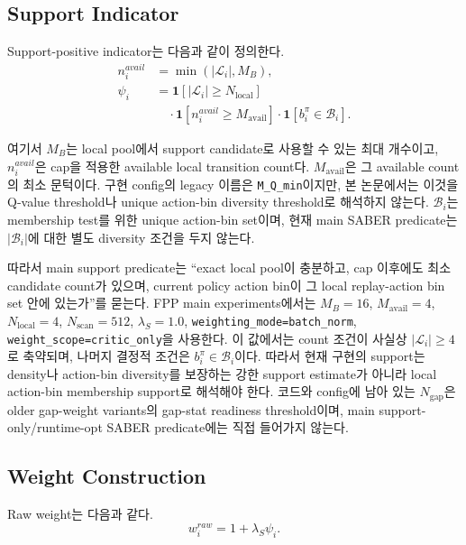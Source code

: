 \documentclass[letterpaper]{article}
\begin{document}
\subsection{Support Indicator}

Support-positive indicator는 다음과 같이 정의한다.
\begin{equation}
\begin{aligned}
n_i^{avail} &= \min(|\mathcal L_i|, M_B),\\
\psi_i &= \mathbf 1[|\mathcal L_i|\ge N_{\mathrm{local}}]\\
&\quad\cdot\mathbf 1[n_i^{avail}\ge M_{\mathrm{avail}}]
\cdot\mathbf 1[b_i^\pi\in\mathcal B_i].
\end{aligned}
\end{equation}

여기서 \(M_B\)는 local pool에서 support candidate로 사용할 수 있는 최대 개수이고, \(n_i^{avail}\)은 cap을 적용한 available local transition count다. \(M_{\mathrm{avail}}\)은 그 available count의 최소 문턱이다. 구현 config의 legacy 이름은 \texttt{M\_Q\_min}이지만, 본 논문에서는 이것을 Q-value threshold나 unique action-bin diversity threshold로 해석하지 않는다. \(\mathcal B_i\)는 membership test를 위한 unique action-bin set이며, 현재 main SABER predicate는 \(|\mathcal B_i|\)에 대한 별도 diversity 조건을 두지 않는다.

따라서 main support predicate는 ``exact local pool이 충분하고, cap 이후에도 최소 candidate count가 있으며, current policy action bin이 그 local replay-action bin set 안에 있는가''를 묻는다. FPP main experiments에서는 \(M_B=16\), \(M_{\mathrm{avail}}=4\), \(N_{\mathrm{local}}=4\), \(N_{\mathrm{scan}}=512\), \(\lambda_S=1.0\), \texttt{weighting\_mode=batch\_norm}, \texttt{weight\_scope=critic\_only}을 사용한다. 이 값에서는 count 조건이 사실상 \(|\mathcal L_i|\ge 4\)로 축약되며, 나머지 결정적 조건은 \(b_i^\pi\in\mathcal B_i\)이다. 따라서 현재 구현의 support는 density나 action-bin diversity를 보장하는 강한 support estimate가 아니라 local action-bin membership support로 해석해야 한다. 코드와 config에 남아 있는 \(N_{\mathrm{gap}}\)은 older gap-weight variants의 gap-stat readiness threshold이며, main support-only/runtime-opt SABER predicate에는 직접 들어가지 않는다.

\subsection{Weight Construction}

Raw weight는 다음과 같다.
\begin{equation}
w_i^{raw} = 1 + \lambda_S \psi_i.
\end{equation}
\end{document}
